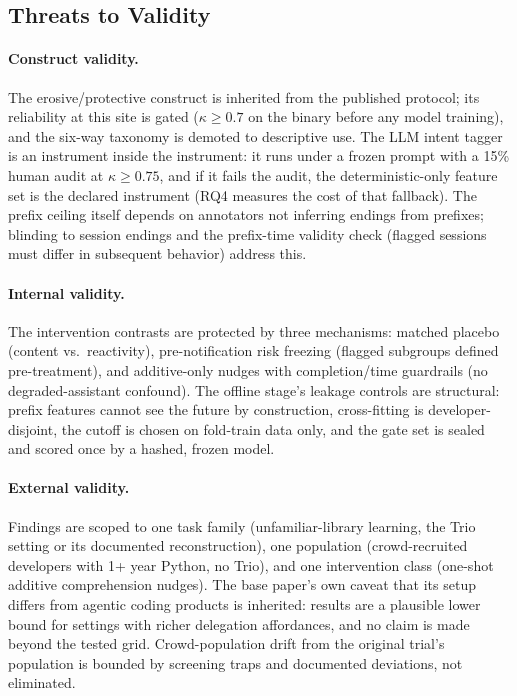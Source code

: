 \documentclass[11pt]{article}
\begin{document}
\subsection{Threats to Validity}

\paragraph{Construct validity.}
The erosive/protective construct is inherited from the published protocol; its reliability at this site is gated ($\kappa \geq 0.7$ on the binary before any model training), and the six-way taxonomy is demoted to descriptive use. The LLM intent tagger is an instrument inside the instrument: it runs under a frozen prompt with a 15\% human audit at $\kappa \geq 0.75$, and if it fails the audit, the deterministic-only feature set is the declared instrument (RQ4 measures the cost of that fallback). The prefix ceiling itself depends on annotators not inferring endings from prefixes; blinding to session endings and the prefix-time validity check (flagged sessions must differ in subsequent behavior) address this.

\paragraph{Internal validity.}
The intervention contrasts are protected by three mechanisms: matched placebo (content vs.\ reactivity), pre-notification risk freezing (flagged subgroups defined pre-treatment), and additive-only nudges with completion/time guardrails (no degraded-assistant confound). The offline stage's leakage controls are structural: prefix features cannot see the future by construction, cross-fitting is developer-disjoint, the cutoff is chosen on fold-train data only, and the gate set is sealed and scored once by a hashed, frozen model.

\paragraph{External validity.}
Findings are scoped to one task family (unfamiliar-library learning, the Trio setting or its documented reconstruction), one population (crowd-recruited developers with 1+ year Python, no Trio), and one intervention class (one-shot additive comprehension nudges). The base paper's own caveat that its setup differs from agentic coding products is inherited: results are a plausible lower bound for settings with richer delegation affordances, and no claim is made beyond the tested grid. Crowd-population drift from the original trial's population is bounded by screening traps and documented deviations, not eliminated.
\end{document}
